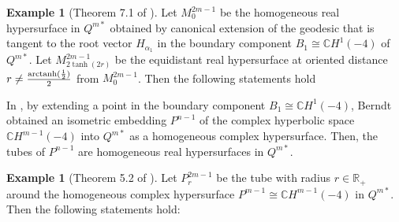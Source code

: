 \documentclass[reqno]{amsart}%
\theoremstyle{definition}
\newtheorem{example}[theorem]{Example}
\numberwithin{equation}{section}
\begin{document}
\begin{example}[Theorem 7.1 of \cite{B-2023}]\label{ex:3.8}
Let $M^{2m-1}_0$ be the homogeneous real hypersurface in $Q^{m*}$ obtained by
canonical extension of the geodesic that is tangent to the root vector $H_{\alpha_1}$ in the boundary
component $B_1\cong \mathbb{C}H^1(-4)$ of $Q^{m*}$.
Let $M^{2m-1}_{2\tanh(2r)}$ be the equidistant real hypersurface at oriented distance $r\neq\frac{{\rm arctanh}(\frac{1}{2})}{2}$ from
$M^{2m-1}_0$. Then the following statements hold
%
\end{example}



In \cite{B-2023}, by extending a point in the boundary
component $B_1\cong \mathbb{C}H^1(-4)$, Berndt obtained an isometric embedding $P^{n-1}$ of the complex hyperbolic space $\mathbb{C}H^{m-1}(-4)$ into $Q^{m*}$ as a homogeneous complex hypersurface.
Then, the tubes of $P^{n-1}$ are homogeneous real hypersurfaces in $Q^{m*}$.


\begin{example}[Theorem 5.2 of \cite{B-2023}]\label{ex:3.9}
Let $P^{2m-1}_r$ be the tube with radius $r\in \mathbb{R}_+$ around the homogeneous complex
hypersurface $P^{m-1}\cong \mathbb{C}H^{m-1}(-4)$ in $Q^{m*}$. Then the following statements hold:
%
\end{example}
\end{document}
